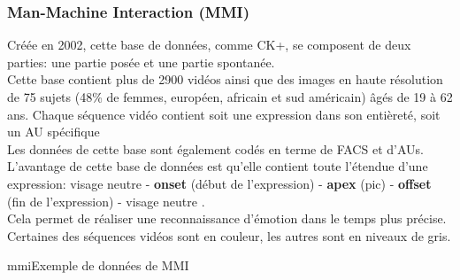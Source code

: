 \documentclass[poster]{polytech/polytech}
\begin{document}
\subsubsection{Man-Machine Interaction (MMI)  \cite{mmi1}\cite{mmi2}}
Créée en 2002, cette base de données, comme CK+, se composent de deux parties: une partie posée et une partie spontanée.\\
Cette base contient plus de 2900 vidéos ainsi que des images en haute résolution de 75 sujets (48\% de femmes, européen, africain et sud américain) âgés de 19 à 62 ans. Chaque séquence vidéo contient soit une expression dans son entièreté, soit un AU spécifique\\
Les données de cette base sont également codés en terme de FACS et d'AUs.\\
L'avantage de cette base de données est qu'elle contient toute l'étendue d'une expression: visage neutre - \textbf{onset} (début de l'expression) - \textbf{apex} (pic) - \textbf{offset} (fin de l'expression) - visage neutre .\\
Cela permet de réaliser une reconnaissance d'émotion dans le temps plus précise.\\
Certaines des séquences vidéos sont en couleur, les autres sont en niveaux de gris.

\begin{Figure}{mmi}{Exemple de données de MMI}
\end{Figure}
\end{document}
